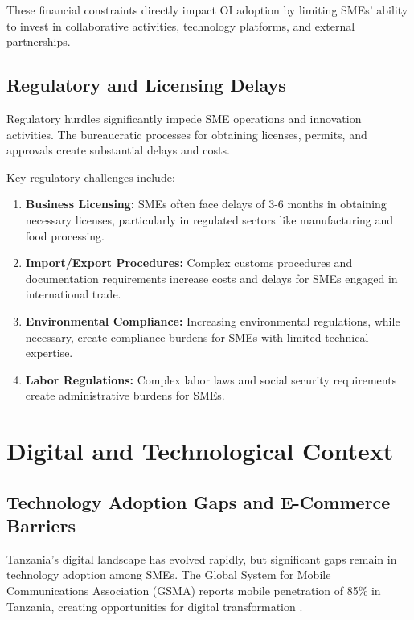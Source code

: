 These financial constraints directly impact OI adoption by limiting SMEs' ability to invest in collaborative activities, technology platforms, and external partnerships.

\subsection{Regulatory and Licensing Delays}

Regulatory hurdles significantly impede SME operations and innovation activities. The bureaucratic processes for obtaining licenses, permits, and approvals create substantial delays and costs.

Key regulatory challenges include:
\begin{enumerate}
    \item \textbf{Business Licensing:} SMEs often face delays of 3-6 months in obtaining necessary licenses, particularly in regulated sectors like manufacturing and food processing.
    \item \textbf{Import/Export Procedures:} Complex customs procedures and documentation requirements increase costs and delays for SMEs engaged in international trade.
    \item \textbf{Environmental Compliance:} Increasing environmental regulations, while necessary, create compliance burdens for SMEs with limited technical expertise.
    \item \textbf{Labor Regulations:} Complex labor laws and social security requirements create administrative burdens for SMEs.
\end{enumerate}

\section{Digital and Technological Context}

\subsection{Technology Adoption Gaps and E-Commerce Barriers}

Tanzania's digital landscape has evolved rapidly, but significant gaps remain in technology adoption among SMEs. The Global System for Mobile Communications Association (GSMA) reports mobile penetration of 85\% in Tanzania, creating opportunities for digital transformation \citep{gsma2023mobile}.

